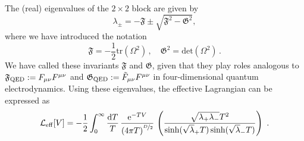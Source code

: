 \documentclass[12pt,a4paper]{article}
\numberwithin{equation}{section}
\numberwithin{equation}{section}
\begin{document}
The (real) eigenvalues of the $2\times 2$ block are given by
\begin{equation}
\lambda_\pm = -\mathfrak F\pm\sqrt{\mathfrak F^2 -\mathfrak G^2},
\end{equation}
where we have introduced the notation
\begin{equation}
\mathfrak F = -\frac{1}{2}\mathrm{tr}(\Omega^2)\, ,\quad \mathfrak G^2=\mathrm{det}(\Omega^2)\, .
\end{equation}
We have called these invariants $\mathfrak F$ and $\mathfrak G$, given that they play roles analogous to $\mathfrak{F}_{\rm QED}:=F_{\mu\nu} F^{\mu\nu}$ and $\mathfrak{G}_{\rm QED}:=\tilde F_{\mu\nu} F^{\mu\nu}$ in four-dimensional
quantum electrodynamics. 
Using these eigenvalues, the effective Lagrangian can be expressed as
\begin{equation} \label{Leff2D}
\mathcal{L}_{\mathrm{eff}}[V]=-\frac12 \int_0^{\infty} \frac{{\rm d}T}{T} \, \frac{\mathrm{e}^{-TV} }{\left( 4\pi T \right)^{\nicefrac{D}{2}}} \, \left( \frac{\sqrt{\lambda_+\lambda_-}T^2}{\sinh(\sqrt \lambda_+T)\sinh(\sqrt \lambda_-T)} \right)\ .
\end{equation}
\end{document}
